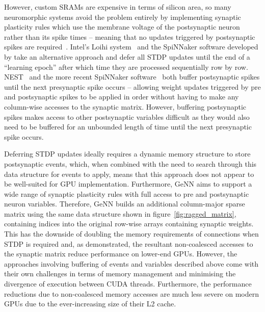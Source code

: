 \documentclass[utf8]{frontiersSCNS} %
\begin{document}
However, custom SRAMs are expensive in terms of silicon area, so many neuromorphic systems avoid the problem entirely by implementing synaptic plasticity rules which use the membrane voltage of the postsynaptic neuron rather than its spike times -- meaning that no updates triggered by postsynaptic spikes are required~\citep{Frenkel2018,Qiao2015}.
Intel's Loihi system~\citep{Davies2018} and the SpiNNaker software developed by \citet{Galluppi2014a} take an alternative approach and defer all STDP updates until the end of a ``learning epoch'' after which time they are processed sequentially row by row.
NEST~\citep{Morrison2007} and the more recent SpiNNaker software~\citep{Knight2016} both buffer postsynaptic spikes until the next presynaptic spike occurs -- allowing weight updates triggered by pre and postsynaptic spikes to be applied in order without having to make any column-wise accesses to the synaptic matrix. 
However, buffering postsynaptic spikes makes access to other postsynaptic variables difficult as they would also need to be buffered for an unbounded length of time until the next presynaptic spike occurs.

Deferring STDP updates ideally requires a dynamic memory structure to store postsynaptic events, which, when combined with the need to search through this data structure for events to apply, means that this approach does not appear to be well-suited for GPU implementation.
Furthermore, GeNN aims to support a wide range of synaptic plasticity rules with full access to pre and postsynaptic neuron variables.
Therefore, GeNN builds an additional column-major sparse matrix using the same data structure shown in figure~\ref{fig:ragged_matrix}, containing indices into the original row-wise arrays containing synaptic weights.
This has the downside of doubling the memory requirements of connections when STDP is required and, as \citet{Yavuz2016} demonstrated, the resultant non-coalesced accesses to the synaptic matrix reduce performance on lower-end GPUs. 
However, the approaches involving buffering of events and variables described above come with their own challenges in terms of memory management and minimising the divergence of execution between CUDA threads.
Furthermore, the performance reductions due to non-coalesced memory accesses are much less severe on modern GPUs due to the ever-increasing size of their L2 cache.
\end{document}
